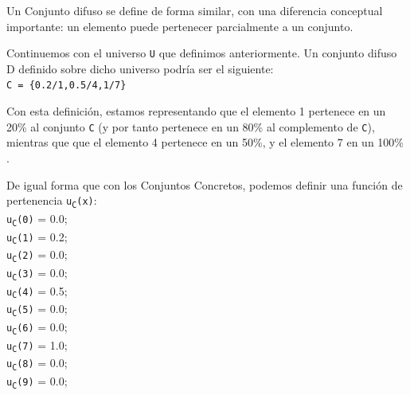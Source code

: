 Un Conjunto difuso se define de forma similar, con una diferencia conceptual importante: un elemento puede pertenecer parcialmente a un conjunto. 

Continuemos con el universo \texttt{U} que definimos anteriormente.
Un conjunto difuso D definido sobre dicho universo podría ser el siguiente:
\\ \newline
\null\hspace{0.59cm}\texttt{C = \{0.2/1,0.5/4,1/7\}}

Con esta definición, estamos representando que el elemento 1 pertenece en un 20\% al
conjunto \texttt{C} (y por tanto pertenece en un 80\% al complemento de \texttt{C}), mientras que
que el elemento 4 pertenece en un 50\%, y el elemento 7 en un 100\% .

De igual forma que con los Conjuntos Concretos, podemos definir una función de pertenencia \texttt{u\textsubscript{C}(x)}:
\\ \newline
\null\hspace{0.59cm}\texttt{u\textsubscript{C}(0)} = 0.0;\\
\null\hspace{0.59cm}\texttt{u\textsubscript{C}(1)} = 0.2;\\
\null\hspace{0.59cm}\texttt{u\textsubscript{C}(2)} = 0.0;\\
\null\hspace{0.59cm}\texttt{u\textsubscript{C}(3)} = 0.0;\\
\null\hspace{0.59cm}\texttt{u\textsubscript{C}(4)} = 0.5;\\
\null\hspace{0.59cm}\texttt{u\textsubscript{C}(5)} = 0.0;\\
\null\hspace{0.59cm}\texttt{u\textsubscript{C}(6)} = 0.0;\\
\null\hspace{0.59cm}\texttt{u\textsubscript{C}(7)} = 1.0;\\
\null\hspace{0.59cm}\texttt{u\textsubscript{C}(8)} = 0.0;\\
\null\hspace{0.59cm}\texttt{u\textsubscript{C}(9)} = 0.0;


